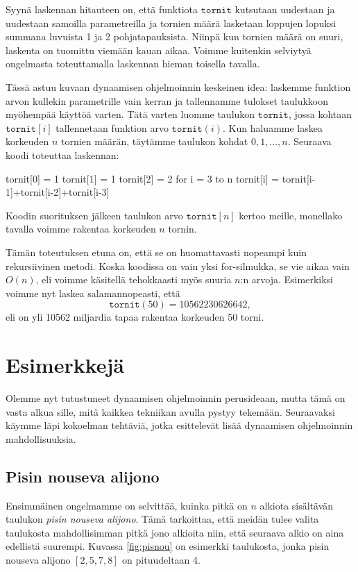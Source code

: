 Syynä laskennan hitauteen on, että funktiota $\texttt{tornit}$
kutsutaan uudestaan ja uudestaan samoilla parametreilla
ja tornien määrä lasketaan loppujen lopuksi summana
luvuista 1 ja 2 pohjatapauksista.
Niinpä kun tornien määrä on suuri,
laskenta on tuomittu viemään kauan aikaa.
Voimme kuitenkin selviytyä ongelmasta toteuttamalla
laskennan hieman toisella tavalla.

Tässä astuu kuvaan dynaamisen ohjelmoinnin keskeinen idea:
laskemme funktion arvon kullekin parametrille vain kerran
ja tallennamme tulokset taulukkoon myöhempää käyttöä varten.
Tätä varten luomme taulukon $\texttt{tornit}$,
jossa kohtaan $\texttt{tornit}[i]$ tallennetaan funktion
arvo $\texttt{tornit}(i)$.
Kun haluamme laskea korkeuden $n$ tornien määrän,
täytämme taulukon kohdat $0,1,\dots,n$.
Seuraava koodi toteuttaa laskennan:

\begin{code}
tornit[0] = 1
tornit[1] = 1
tornit[2] = 2
for i = 3 to n
    tornit[i] = tornit[i-1]+tornit[i-2]+tornit[i-3]
\end{code}

Koodin suorituksen jälkeen taulukon arvo $\texttt{tornit}[n]$
kertoo meille, monellako tavalla voimme rakentaa
korkeuden $n$ tornin.

Tämän toteutuksen etuna on, että se on huomattavasti
nopeampi kuin rekursiivinen metodi.
Koska koodissa on vain yksi for-silmukka, se vie aikaa
vain $O(n)$, eli voimme käsitellä tehokkaasti myös
suuria $n$:n arvoja.
Esimerkiksi voimme nyt laskea salamannopeasti, että
\[
\texttt{tornit}(50) = 10562230626642,
\]
eli on yli 10562 miljardia tapaa rakentaa korkeuden 50 torni.

\section{Esimerkkejä}

Olemme nyt tutustuneet dynaamisen ohjelmoinnin perusideaan,
mutta tämä on vasta alkua sille, mitä kaikkea tekniikan
avulla pystyy tekemään.
Seuraavaksi käymme läpi kokoelman tehtäviä,
jotka esittelevät lisää dynaamisen ohjelmoinnin mahdollisuuksia.

\subsection{Pisin nouseva alijono}

Ensimmäinen ongelmamme on selvittää, kuinka pitkä on
$n$ alkiota sisältävän taulukon \emph{pisin nouseva alijono}.
Tämä tarkoittaa, että meidän tulee valita taulukosta
mahdollisimman pitkä jono alkioita niin,
että seuraava alkio on aina edellistä suurempi.
Kuvassa \ref{fig:pisnou} on esimerkki taulukosta,
jonka pisin nouseva alijono $[2,5,7,8]$ on pituudeltaan 4.

